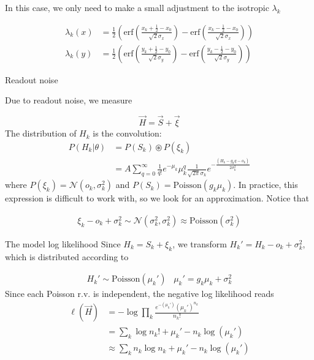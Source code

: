 \documentclass[aspectratio=169]{beamer}
\begin{document}
\begin{frame}

In this case, we only need to make a small adjustment to the isotropic $\lambda_{k}$

\begin{align*}
\lambda_{k}(x) &= \frac{1}{2}\left(\mathrm{erf}\left(\frac{x_{k}+\frac{1}{2}-x_{0}}{\sqrt{2}\sigma_{x}}\right) -\mathrm{erf}\left(\frac{x_{k}-\frac{1}{2}-x_{0}}{\sqrt{2}\sigma_{x}}\right)\right)\\
\lambda_{k}(y) &= \frac{1}{2}\left(\mathrm{erf}\left(\frac{y_{k}+\frac{1}{2}-y_{0}}{\sqrt{2}\sigma_{y}}\right) -\mathrm{erf}\left(\frac{y_{k}-\frac{1}{2}-y_{0}}{\sqrt{2}\sigma_{y}}\right)\right)
\end{align*}

\end{frame}


\begin{frame}{Readout noise}

Due to readout noise, we measure

\begin{equation*}
\vec{H} = \vec{S} + \vec{\xi}
\end{equation*}
The distribution of $H_{k}$ is the convolution:
\begin{align*}
P(H_{k}|\theta) &= P(S_{k})\circledast P(\xi_{k})\\
&= A\sum_{q=0}^{\infty} \frac{1}{q!}e^{-\mu_{k}}\mu_{k}^{q}\frac{1}{\sqrt{2\pi}\sigma_{k}}e^{-\frac{(H_{k}-g_{k}q-o_{k})}{2\sigma_{k}^{2}}}
\end{align*}
where $P(\xi_{k}) = \mathcal{N}(o_{k},\sigma_{k}^{2})$ and $P(S_{k}) = \mathrm{Poisson}(g_{k}\mu_{k})$. In practice, this expression is difficult to work with, so we look for an approximation. Notice that 

\begin{align*}
\xi_{k} - o_{k} + \sigma_{k}^{2} \sim \mathcal{N}(\sigma_{k}^{2},\sigma_{k}^{2}) \approx \mathrm{Poisson}(\sigma_{k}^{2})
\end{align*}

\end{frame}

\begin{frame}{The model log likelihood}
Since $H_{k} = S_{k} + \xi_{k}$, we transform $H_{k}' = H_{k} - o_{k} + \sigma_{k}^{2}$, which is distributed according to 

\begin{align*}
H_{k}' \sim \mathrm{Poisson}(\mu_{k}')\;\;\;\mu_{k}' = g_{k}\mu_{k} + \sigma_{k}^{2}
\end{align*}
Since each Poisson r.v. is independent, the negative log likelihood reads
\begin{align*}
\ell(\vec{H}) &= -\log \prod_{k} \frac{e^{-\left(\mu_{k}'\right)}\left(\mu_{k}'\right)^{n_{k}}}{n_{k}!}\\
&= \sum_{k}  \log n_{k}! + \mu_{k}' - n_{k}\log\left(\mu_{k}'\right)\\
&\approx \sum_{k}  n_{k}\log n_{k} + \mu_{k}' - n_{k}\log\left(\mu_{k}'\right)
\end{align*}

\end{frame}
\end{document}
